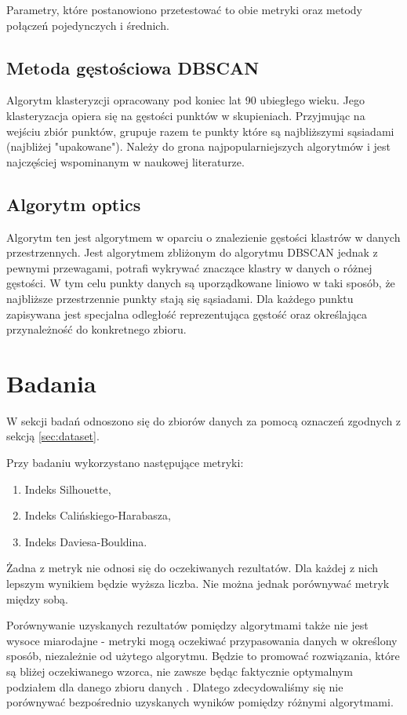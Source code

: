 \documentclass[a4paper,11pt]{article}
\begin{document}
Parametry, które postanowiono przetestować to obie metryki oraz metody połączeń pojedynczych i średnich.

\subsection{Metoda gęstościowa DBSCAN}
Algorytm klasteryzcji opracowany pod koniec lat 90 ubiegłego wieku. Jego klasteryzacja opiera się na gęstości punktów w skupieniach. Przyjmując na wejściu zbiór punktów, grupuje razem te punkty które są najbliższymi sąsiadami (najbliżej "upakowane"). Należy do grona najpopularniejszych algorytmów i jest najczęściej wspominanym w naukowej literaturze. 

\subsection{Algorytm optics}
Algorytm ten jest algorytmem w oparciu o znalezienie gęstości klastrów w danych przestrzennych. Jest algorytmem zbliżonym do algorytmu DBSCAN jednak z pewnymi przewagami, potrafi wykrywać znaczące klastry w danych o różnej gęstości. W tym celu punkty danych są uporządkowane liniowo w taki sposób, że najbliższe przestrzennie punkty stają się sąsiadami. Dla każdego punktu zapisywana jest specjalna odległość reprezentująca gęstość oraz określająca przynależność do konkretnego zbioru.



\section{Badania}

W sekcji badań odnoszono się do zbiorów danych za pomocą oznaczeń zgodnych z sekcją \ref{sec:dataset}.

Przy badaniu wykorzystano następujące metryki:

\begin{enumerate}
    \item Indeks Silhouette,
    \item Indeks Calińskiego-Harabasza,
    \item Indeks Daviesa-Bouldina.
\end{enumerate}

Żadna z metryk nie odnosi się do oczekiwanych rezultatów. Dla każdej z nich lepszym wynikiem będzie wyższa liczba. Nie można jednak porównywać metryk między sobą.

Porównywanie uzyskanych rezultatów pomiędzy algorytmami także nie jest wysoce miarodajne - metryki mogą oczekiwać przypasowania danych w określony sposób, niezależnie od użytego algorytmu. Będzie to promować rozwiązania, które są bliżej oczekiwanego wzorca, nie zawsze będąc faktycznie optymalnym podziałem dla danego zbioru danych \cite{ClusteringQuality}. Dlatego zdecydowaliśmy się nie porównywać bezpośrednio uzyskanych wyników pomiędzy różnymi algorytmami.
\end{document}
